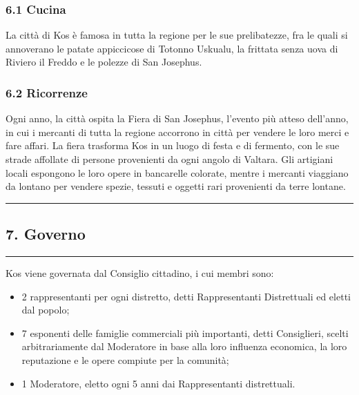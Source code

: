 \subsubsection{6.1 Cucina}\label{cucina}

La città di Kos è famosa in tutta la regione per le sue prelibatezze,
fra le quali si annoverano le patate appiccicose di Totonno Uskualu, la
frittata senza uova di Riviero il Freddo e le polezze di San Josephus.

\subsubsection{6.2 Ricorrenze}\label{ricorrenze}

Ogni anno, la città ospita la Fiera di San Josephus, l'evento più atteso
dell'anno, in cui i mercanti di tutta la regione accorrono in città per
vendere le loro merci e fare affari. La fiera trasforma Kos in un luogo
di festa e di fermento, con le sue strade affollate di persone
provenienti da ogni angolo di Valtara. Gli artigiani locali espongono le
loro opere in bancarelle colorate, mentre i mercanti viaggiano da
lontano per vendere spezie, tessuti e oggetti rari provenienti da terre
lontane.

\begin{center}\rule{0.5\linewidth}{0.5pt}\end{center}

\subsection{7. Governo}\label{governo}

\begin{center}\rule{0.5\linewidth}{0.5pt}\end{center}

Kos viene governata dal Consiglio cittadino, i cui membri sono:

\begin{itemize}
\tightlist
\item
  2 rappresentanti per ogni distretto, detti Rappresentanti Distrettuali
  ed eletti dal popolo;
\item
  7 esponenti delle famiglie commerciali più importanti, detti
  Consiglieri, scelti arbitrariamente dal Moderatore in base alla loro
  influenza economica, la loro reputazione e le opere compiute per la
  comunità;
\item
  1 Moderatore, eletto ogni 5 anni dai Rappresentanti distrettuali.
\end{itemize}

